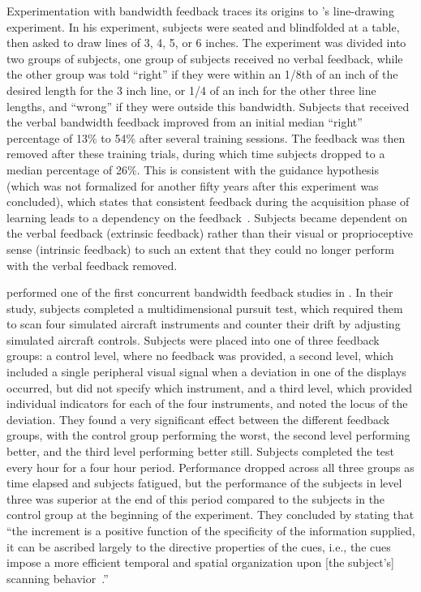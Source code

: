 Experimentation with bandwidth feedback traces its origins to \citeauthor{thorndike_law_1927}'s \citeyear{thorndike_law_1927} line-drawing experiment.
In his experiment, subjects were seated and blindfolded at a table, then asked to draw lines of 3, 4, 5, or 6 inches.
The experiment was divided into two groups of subjects, one group of subjects received no verbal feedback, while the other group was told ``right'' if they were within an 1/8th of an inch of the desired length for the 3 inch line, or 1/4 of an inch for the other three line lengths, and ``wrong'' if they were outside this bandwidth.
Subjects that received the verbal bandwidth feedback improved from an initial median ``right'' percentage of 13\% to 54\% after several training sessions.
The feedback was then removed after these training trials, during which time subjects dropped to a median percentage of 26\%.
This is consistent with the guidance hypothesis (which was not formalized for another fifty years after this experiment was concluded), which states that consistent feedback during the acquisition phase of learning leads to a dependency on the feedback~\citep{salmoni_knowledge_1984}.
Subjects became dependent on the verbal feedback (extrinsic feedback) rather than their visual or proprioceptive sense (intrinsic feedback) to such an extent that they could no longer perform with the verbal feedback removed.

\citeauthor{payne_effect_1955} performed one of the first concurrent bandwidth feedback studies in \citeyear{payne_effect_1955}.
In their study, subjects completed a multidimensional pursuit test, which required them to scan four simulated aircraft instruments and counter their drift by adjusting simulated aircraft controls.
Subjects were placed into one of three feedback groups: a control level, where no feedback was provided, a second level, which included a single peripheral visual signal when a deviation in one of the displays occurred, but did not specify which instrument, and a third level, which provided individual indicators for each of the four instruments, and noted the locus of the deviation.
They found a very significant effect between the different feedback groups, with the control group performing the worst, the second level performing better, and the third level performing better still.
Subjects completed the test every hour for a four hour period.
Performance dropped across all three groups as time elapsed and subjects fatigued, but the performance of the subjects in level three was superior at the end of this period compared to the subjects in the control group at the beginning of the experiment.
They concluded by stating that ``the increment is a positive function of the specificity of the information supplied, it can be ascribed largely to the directive properties of the cues, i.e., the cues impose a more efficient temporal and spatial organization upon [the subject's] scanning behavior~\citep{payne_effect_1955}.''

